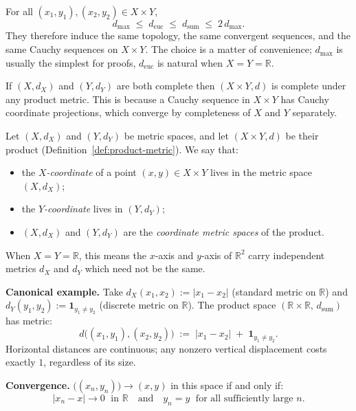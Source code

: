 \begin{remark*}
For all $(x_1,y_1), (x_2,y_2) \in X \times Y$,
\[
d_{\max} \;\le\; d_{\mathrm{euc}} \;\le\; d_{\mathrm{sum}}
\;\le\; 2\,d_{\max}.
\]
They therefore induce the same topology, the same convergent sequences,
and the same Cauchy sequences on $X \times Y$.
The choice is a matter of convenience; $d_{\max}$ is usually the simplest
for proofs, $d_{\mathrm{euc}}$ is natural when $X = Y = \mathbb{R}$.
\end{remark*}

\begin{remark*}
If $(X, d_X)$ and $(Y, d_Y)$ are both complete then $(X \times Y, d)$
is complete under any product metric.
This is because a Cauchy sequence in $X \times Y$ has Cauchy coordinate
projections, which converge by completeness of $X$ and $Y$ separately.
\end{remark*}


\begin{tcolorbox}[colback=propbox, colframe=propborder, arc=2pt,
  left=6pt, right=6pt, top=4pt, bottom=4pt,
  title={\small\textbf{Definition (Coordinate Metric Spaces)}},
  fonttitle=\small\bfseries]
\begin{definition}
\label{def:product-coord-metrics}
Let $(X, d_X)$ and $(Y, d_Y)$ be metric spaces, and let
$(X \times Y, d)$ be their product (Definition~\ref{def:product-metric}).
We say that:
\begin{itemize}
  \item the \emph{$X$-coordinate} of a point $(x, y) \in X \times Y$ lives
        in the metric space $(X, d_X)$;
  \item the \emph{$Y$-coordinate} lives in $(Y, d_Y)$;
  \item $(X, d_X)$ and $(Y, d_Y)$ are the \emph{coordinate metric spaces}
        of the product.
\end{itemize}
When $X = Y = \mathbb{R}$, this means the $x$-axis and $y$-axis of
$\mathbb{R}^2$ carry independent metrics $d_X$ and $d_Y$ which need not
be the same.

\medskip
\noindent\textbf{Canonical example.}\quad
Take $d_X(x_1,x_2) := |x_1 - x_2|$ (standard metric on $\mathbb{R}$) and
$d_Y(y_1,y_2) := \mathbf{1}_{y_1 \neq y_2}$ (discrete metric on $\mathbb{R}$).
The product space $(\mathbb{R} \times \mathbb{R},\, d_{\mathrm{sum}})$ has
metric:
\[
d\bigl((x_1,y_1),(x_2,y_2)\bigr)
\;:=\; |x_1 - x_2| \;+\; \mathbf{1}_{y_1 \neq y_2}.
\]
Horizontal distances are continuous; any nonzero vertical displacement costs
exactly $1$, regardless of its size.

\medskip
\noindent\textbf{Convergence.}\quad
$\bigl((x_n, y_n)\bigr) \to (x, y)$ in this space if and only if:
\[
|x_n - x| \to 0 \;\text{ in } \mathbb{R}
\quad\text{and}\quad
y_n = y \;\text{ for all sufficiently large } n.
\]
\end{definition}
\end{tcolorbox}

